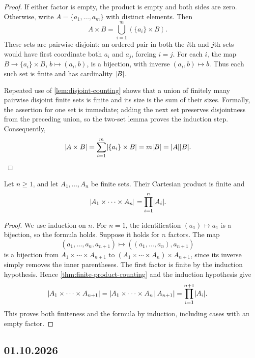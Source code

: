 \documentclass[11pt,a4paper]{amsart}
\begin{document}
\begin{proof}
  If either factor is empty, the product is empty and both sides are
  zero. Otherwise, write \(A=\{a_1,\ldots,a_m\}\) with distinct
  elements. Then
  \[
    A\times B=\bigcup_{i=1}^{m}(\{a_i\}\times B).
  \]
  These sets are pairwise disjoint: an ordered pair in both the
  \(i\)th and \(j\)th sets would have first coordinate both \(a_i\)
  and \(a_j\), forcing \(i=j\). For each \(i\), the map
  \(B\to\{a_i\}\times B\), \(b\mapsto(a_i,b)\), is a bijection,
  with inverse \((a_i,b)\mapsto b\). Thus each such set is finite
  and has cardinality \(\lvert B\rvert\).

  Repeated use of \cref{lem:disjoint-counting} shows that a union of
  finitely many pairwise disjoint finite sets is finite and its size
  is the sum of their sizes. Formally, the assertion for one set is
  immediate; adding the next set preserves disjointness from the
  preceding union, so the two-set lemma proves the induction step.
  Consequently,
  \[
    \lvert A\times B\rvert
    =\sum_{i=1}^{m}\lvert\{a_i\}\times B\rvert
    =m\lvert B\rvert=\lvert A\rvert\lvert B\rvert.\qedhere
  \]
\end{proof}

\begin{theorem}
  Let \(n\geq1\), and let \(A_1,\ldots,A_n\) be finite sets.
  Their Cartesian product is finite and
  \[
    \lvert A_1\times\cdots\times A_n\rvert
    =\prod_{i=1}^{n}\lvert A_i\rvert.
  \]
\end{theorem}

\begin{proof}
  We use induction on \(n\). For \(n=1\), the identification
  \((a_1)\mapsto a_1\) is a bijection, so the formula holds.
  Suppose it holds for \(n\) factors. The map
  \[
    (a_1,\ldots,a_n,a_{n+1})
    \longmapsto ((a_1,\ldots,a_n),a_{n+1})
  \]
  is a bijection from \(A_1\times\cdots\times A_{n+1}\) to
  \((A_1\times\cdots\times A_n)\times A_{n+1}\), since its inverse
  simply removes the inner parentheses. The first factor is finite
  by the induction hypothesis. Hence \cref{thm:finite-product-counting}
  and the induction hypothesis give
  \[
    \lvert A_1\times\cdots\times A_{n+1}\rvert
    =\lvert A_1\times\cdots\times A_n\rvert\lvert A_{n+1}\rvert
    =\prod_{i=1}^{n+1}\lvert A_i\rvert.
  \]
  This proves both finiteness and the formula by induction, including
  cases with an empty factor.
\end{proof}

\subsection{01.10.2026}
\end{document}

